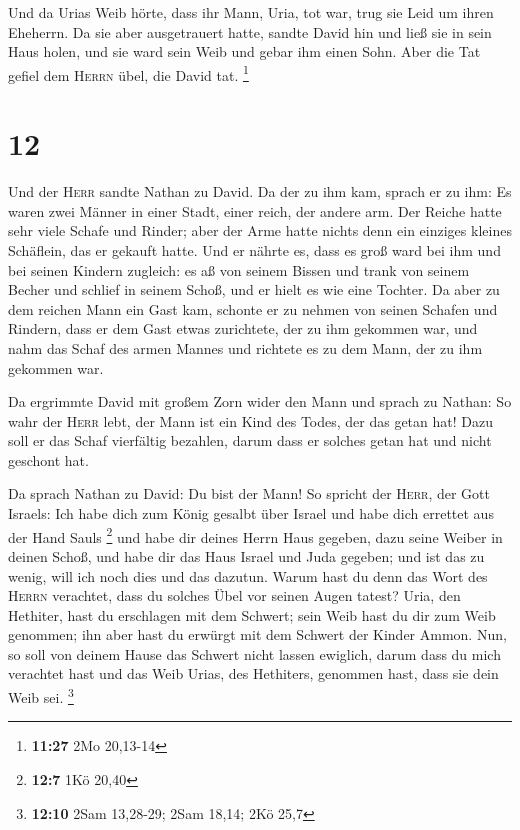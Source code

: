  Und da Urias Weib hörte, dass ihr Mann, Uria, tot war,
trug sie Leid um ihren Eheherrn.  Da sie aber
ausgetrauert hatte, sandte David hin und ließ sie in sein Haus holen,
und sie ward sein Weib und gebar ihm einen Sohn. Aber die Tat gefiel dem
\textsc{Herrn} übel, die David tat. \footnote{\textbf{11:27} 2Mo
  20,13-14}

\hypertarget{section-1}{%
\section{12}\label{section-1}}

 Und der \textsc{Herr} sandte Nathan zu David. Da der zu
ihm kam, sprach er zu ihm: Es waren zwei Männer in einer Stadt, einer
reich, der andere arm.  Der Reiche hatte sehr viele Schafe
und Rinder;  aber der Arme hatte nichts denn ein einziges
kleines Schäflein, das er gekauft hatte. Und er nährte es, dass es groß
ward bei ihm und bei seinen Kindern zugleich: es aß von seinem Bissen
und trank von seinem Becher und schlief in seinem Schoß, und er hielt es
wie eine Tochter.  Da aber zu dem reichen Mann ein Gast
kam, schonte er zu nehmen von seinen Schafen und Rindern, dass er dem
Gast etwas zurichtete, der zu ihm gekommen war, und nahm das Schaf des
armen Mannes und richtete es zu dem Mann, der zu ihm gekommen war.

 Da ergrimmte David mit großem Zorn wider den Mann und
sprach zu Nathan: So wahr der \textsc{Herr} lebt, der Mann ist ein Kind
des Todes, der das getan hat!  Dazu soll er das Schaf
vierfältig bezahlen, darum dass er solches getan hat und nicht geschont
hat.

 Da sprach Nathan zu David: Du bist der Mann! So spricht
der \textsc{Herr}, der Gott Israels: Ich habe dich zum König gesalbt
über Israel und habe dich errettet aus der Hand Sauls \footnote{\textbf{12:7}
  1Kö 20,40}  und habe dir deines Herrn Haus gegeben, dazu
seine Weiber in deinen Schoß, und habe dir das Haus Israel und Juda
gegeben; und ist das zu wenig, will ich noch dies und das dazutun.
 Warum hast du denn das Wort des \textsc{Herrn} verachtet,
dass du solches Übel vor seinen Augen tatest? Uria, den Hethiter, hast
du erschlagen mit dem Schwert; sein Weib hast du dir zum Weib genommen;
ihn aber hast du erwürgt mit dem Schwert der Kinder Ammon.
 Nun, so soll von deinem Hause das Schwert nicht lassen
ewiglich, darum dass du mich verachtet hast und das Weib Urias, des
Hethiters, genommen hast, dass sie dein Weib sei. \footnote{\textbf{12:10}
  2Sam 13,28-29; 2Sam 18,14; 2Kö 25,7}

